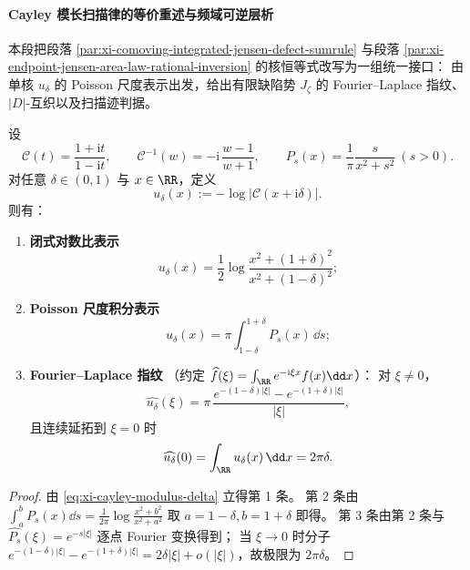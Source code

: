 \paragraph{Cayley 模长扫描律的等价重述与频域可逆层析}\label{par:xi-cayley-poisson-fourier-scan-fingerprint}
本段把段落 \ref{par:xi-comoving-integrated-jensen-defect-sumrule} 与段落
\ref{par:xi-endpoint-jensen-area-law-rational-inversion} 的核恒等式改写为一组统一接口：
由单核 \(u_\delta\) 的 Poisson 尺度表示出发，给出有限缺陷势 \(J_\zeta\) 的 Fourier--Laplace 指纹、\(|D|\)-互织以及扫描迹判据。

\begin{theorem}\label{thm:xi-cayley-modulus-poisson-fourier-fingerprint-layered}
设
\[
\mathcal C(t)=\frac{1+\mathrm{i}t}{1-\mathrm{i}t},
\qquad
\mathcal C^{-1}(w)=-\mathrm{i}\,\frac{w-1}{w+1},
\qquad
P_s(x)=\frac{1}{\pi}\frac{s}{x^2+s^2}\ (s>0).
\]
对任意 \(\delta\in(0,1)\) 与 \(x\in\RR\)，定义
\[
u_\delta(x):=-\log\bigl|\mathcal C(x+\mathrm{i}\delta)\bigr|.
\]
则有：
\begin{enumerate}
  \item \textbf{闭式对数比表示}
  \[
  u_\delta(x)=\frac12\log\frac{x^2+(1+\delta)^2}{x^2+(1-\delta)^2};
  \]
  \item \textbf{Poisson 尺度积分表示}
  \[
  u_\delta(x)=\pi\int_{1-\delta}^{1+\delta}P_s(x)\,\dd s;
  \]
  \item \textbf{Fourier--Laplace 指纹}
  （约定 \(\widehat f(\xi)=\int_{\RR}e^{-\mathrm{i}\xi x}f(x)\dd x\)）：
  对 \(\xi\neq 0\)，
  \[
  \widehat{u_\delta}(\xi)
  =\pi\,\frac{e^{-(1-\delta)|\xi|}-e^{-(1+\delta)|\xi|}}{|\xi|},
  \]
  且连续延拓到 \(\xi=0\) 时
  \[
  \widehat{u_\delta}(0)=\int_{\RR}u_\delta(x)\,\dd x=2\pi\delta.
  \]
\end{enumerate}
\end{theorem}
\begin{proof}
由 \eqref{eq:xi-cayley-modulus-delta} 立得第 1 条。
第 2 条由
\(
\int_a^b P_s(x)\dd s=\frac{1}{2\pi}\log\frac{x^2+b^2}{x^2+a^2}
\)
取 \(a=1-\delta,b=1+\delta\) 即得。
第 3 条由第 2 条与
\(
\widehat{P_s}(\xi)=e^{-s|\xi|}
\)
逐点 Fourier 变换得到；
当 \(\xi\to 0\) 时分子
\(
e^{-(1-\delta)|\xi|}-e^{-(1+\delta)|\xi|}
=2\delta|\xi|+o(|\xi|)
\)，故极限为 \(2\pi\delta\)。
\end{proof}



